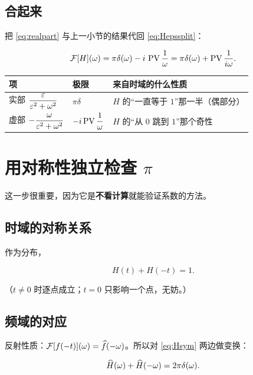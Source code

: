 \subsection{合起来}

把 \eqref{eq:realpart} 与上一小节的结果代回 \eqref{eq:Hepssplit}：

\begin{equation}
\mathcal{F}[H](\omega)=\pi\delta(\omega)-i\,\operatorname{PV}\frac{1}{\omega}
=\pi\delta(\omega)+\operatorname{PV}\frac{1}{i\omega} .\label{eq:FH}
\end{equation}

\begin{center}
\small
\renewcommand{\arraystretch}{1.4}
\begin{tabularx}{\textwidth}{@{}L{4.2cm}L{3.4cm}Y@{}}
\toprule
项 & 极限 & 来自时域的什么性质 \\
\midrule
实部 $\dfrac{\varepsilon}{\varepsilon^{2}+\omega^{2}}$ & $\pi\delta$ & $H$ 的“一直等于 $1$”那一半（偶部分）\\
虚部 $-\dfrac{\omega}{\varepsilon^{2}+\omega^{2}}$ & $-i\operatorname{PV}\dfrac{1}{\omega}$ & $H$ 的“从 $0$ 跳到 $1$”那个奇性 \\
\bottomrule
\end{tabularx}
\end{center}

\section{用对称性独立检查 $\pi$}

这一步很重要，因为它是\textbf{不看计算}就能验证系数的方法。

\subsection{时域的对称关系}

作为分布，

\begin{equation}
H(t)+H(-t)=1 .\label{eq:Hsym}
\end{equation}

（$t\neq0$ 时逐点成立；$t=0$ 只影响一个点，无妨。）

\subsection{频域的对应}

反射性质：$\mathcal{F}[f(-t)](\omega)=\widehat{f}(-\omega)$。所以对 \eqref{eq:Hsym} 两边做变换：

\begin{equation}
\widehat{H}(\omega)+\widehat{H}(-\omega)=2\pi\delta(\omega).\label{eq:Hfreqsym}
\end{equation}

